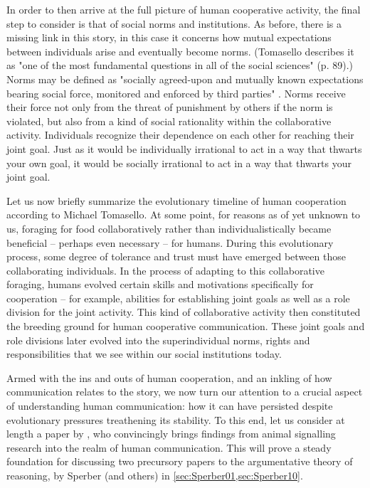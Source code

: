 In order to then arrive at the full picture of human cooperative activity, the final step to consider is that of social norms and institutions. As before, there is a missing link in this story, in this case it concerns how mutual expectations between individuals arise and eventually become norms. (Tomasello describes it as "one of the most fundamental questions in all of the social sciences" (p. 89).)
Norms may be defined as "socially agreed-upon and mutually known expectations bearing social force, monitored and enforced by third parties" \citep[p.~87]{Tomasello09}. Norms receive their force not only from the threat of punishment by others if the norm is violated, but also from a kind of social rationality within the collaborative activity. Individuals recognize their dependence on each other for reaching their joint goal. Just as it would be individually irrational to act in a way that thwarts your own goal, it would be socially irrational to act in a way that thwarts your joint goal.

Let us now briefly summarize the evolutionary timeline of human cooperation according to Michael Tomasello.
At some point, for reasons as of yet unknown to us, foraging for food collaboratively rather than individualistically became beneficial -- perhaps even necessary -- for humans.
During this evolutionary process, some degree of tolerance and trust must have emerged between those collaborating individuals.
In the process of adapting to this collaborative foraging, humans evolved certain skills and motivations specifically for cooperation -- for example, abilities for establishing joint goals as well as a role division for the joint activity.
This kind of collaborative activity then constituted the breeding ground for human cooperative communication.
These joint goals and role divisions later evolved into the superindividual norms, rights and responsibilities that we see within our social institutions today.

Armed with the ins and outs of human cooperation, and an inkling of how communication relates to the story, we now turn our attention to a crucial aspect of understanding human communication: how it can have persisted despite evolutionary pressures treathening its stability. To this end, let us consider at length a paper by \citet{Scott-Phillips08}, who convincingly brings findings from animal signalling research into the realm of human communication. This will prove a steady foundation for discussing two precursory papers to the argumentative theory of reasoning, by Sperber (and others) in \cref{sec:Sperber01,sec:Sperber10}.

